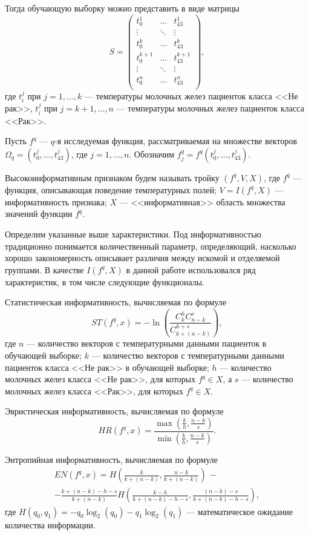 Тогда обучающую выборку можно представить в виде матрицы
\[
S =
\begin{pmatrix}
t_{0}^{1} & \dots & t_{43}^{1} \\
\vdots & \ddots & \vdots \\
t_{0}^{k} & \dots & t_{43}^{k} \\
t_{0}^{k + 1} & \dots & t_{43}^{k + 1} \\
\vdots & \ddots & \vdots \\
t_{0}^{n} & \dots & t_{43}^{n} \\
\end{pmatrix}
,\] где \(t_{i}^{j}\) при \(j = 1, \dots, k\) --- температуры
молочных желез пациенток класса <<Не рак>>, \(t_{i}^{j}\) при \(j =
k + 1, \dots, n\) --- температуры молочных желез пациенток класса
<<Рак>>.

Пусть \(f^{q}\) --- $q$-я исследуемая функция, рассматриваемая на множестве векторов \(\Omega_{q} = {(t_{0}^{j}, \dots, t_{43}^{j})}\), где \(j = 1, \dots, n\). Обозначим \(f_{j}^{q} = f^{q}(t_{0}^{j}, \dots, t_{43}^{j})\).

Высокоинформативным признаком будем называть тройку \((f^{q}, V, X)\), где \(f^{q}\) --- функция, описывающая поведение температурных полей; \(V = I(f^{q}, X)\) --- информативность признака; $X$ --- <<информативная>> область множества значений функции \(f^{q}\).

Определим указанные выше характеристики. Под информативностью
традиционно понимается количественный параметр, определяющий,
насколько хорошо закономерность описывает различия между искомой и
отделяемой группами. В качестве \(I(f^{q}, X)\) в данной работе
использовался ряд характеристик, в том числе следующие
функционалы.

Статистическая информативность, вычисляемая по формуле
\[ST(f^{q}, x) = -\ln(\frac{C_{k}^{h}C_{n - k}^{s}}{C_{k + (n - k)}^{h +
s}}),\] где $n$ --- количество векторов с температурными данными
пациенток в обучающей выборке; $k$ --- количество векторов с
температурными данными пациенток класса <<Не рак>> в обучающей
выборке; $h$ --- количество молочных желез класса <<Не рак>>, для
которых \(f^{q} \in X\), а $s$ --- количество молочных желез класса
<<Рак>>, для которых \(f^{q} \in X.\)

Эвристическая информативность, вычисляемая по формуле
\[HR(f^{q}, x) = \frac{\max(\frac{k}{h}, \frac{n - k}{s})}{\min(\frac{k}{h}, \frac{n - k}{s})}.\]


Энтропийная информативность, вычисляемая по формуле
\begin{align*}
EN(f^{q}, x) = H(\frac{k}{k + (n - k)}, \frac{n - k}{k + (n - k)})\,-\\
 - \frac{k + (n - k) - h - s}{k + (n - k)}H(\frac{k - h}{k + (n - k) - h - s},
 \frac{(n - k) - s}{k + (n - k) - h - s}),
\end{align*}
где \(H(q_{0}, q_{1}) = -q_{0}\log_{2}(q_{0}) -q_{1}\log_{2}(q_{1})\) --- математическое ожидание количества информации.

